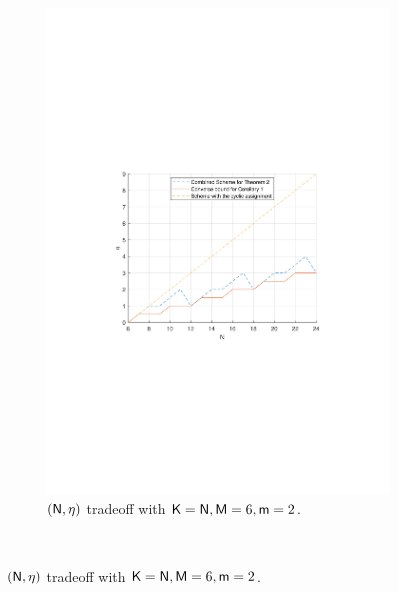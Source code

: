 \documentclass[conference,letterpaper]{IEEEtran}
\begin{document}
\begin{figure}[ht]
    \begin{subfigure}[t]{0.5\textwidth}
        \centering
        \includegraphics[scale=0.45]{N varies.pdf}
        \caption{\small $({\sf N},\eta)$ tradeoff with ${\sf K} = {\sf N}, {\sf M}=6, {\sf m}=2$.}
        \label{fig:numerical 1b}
    \end{subfigure}\\
        \centering
    \fi

\end{figure}
\end{document}
